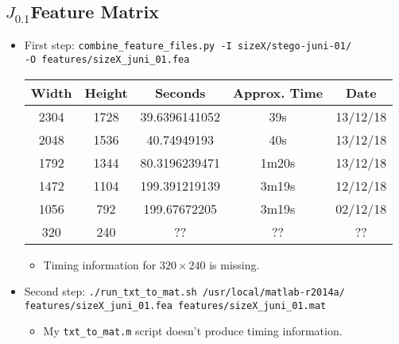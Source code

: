 \documentclass[11pt,a4paper]{report}
\newcommand{\Jtern}{\texorpdfstring{$J_{0.1}$}{J(0.1)}}
\begin{document}
\subsection{\Jtern Feature Matrix}
\begin{itemize}
\item First step: \texttt{combine\_feature\_files.py -I sizeX/stego-juni-01/} \\
         \texttt{-O features/sizeX\_juni\_01.fea}
  \begin{center}
  \begin{tabular}{ c c | c c c }
  Width & Height & Seconds & Approx. Time & Date \\ \hline
  2304 & 1728 & 39.6396141052 & 39s & 13/12/18 \\
  2048 & 1536 & 40.74949193 & 40s & 13/12/18 \\
  1792 & 1344 & 80.3196239471 & 1m20s & 13/12/18 \\
  1472 & 1104 & 199.391219139 & 3m19s & 12/12/18 \\
  1056 & 792 & 199.67672205 & 3m19s & 02/12/18 \\
  320 & 240 & ?? & ?? & ?? \\
  \end{tabular}
  \end{center}
  \begin{itemize}
  \item Timing information for $320 \times 240$ is missing.
  \end{itemize}

\item Second step: \texttt{./run\_txt\_to\_mat.sh /usr/local/matlab-r2014a/} \\
         \texttt{features/sizeX\_juni\_01.fea features/sizeX\_juni\_01.mat}
  \begin{itemize}
  \item My \texttt{txt\_to\_mat.m} script doesn't produce timing information.
  \end{itemize}
\end{itemize}
\end{document}
